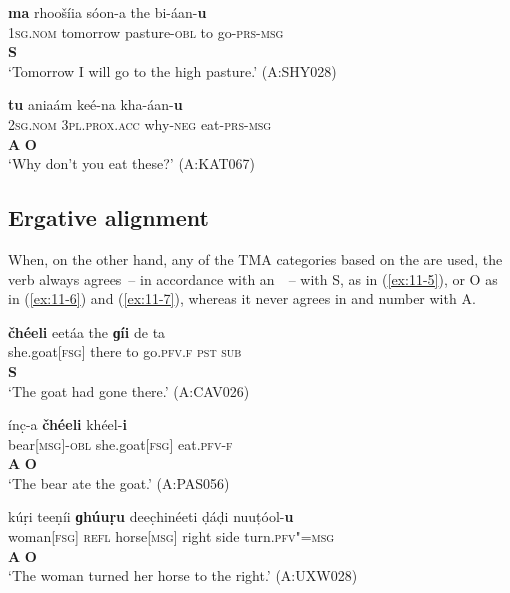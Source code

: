 \begin{exe}
\ex
\label{ex:11-3}
\glll \textbf{ma} rhoošíia sóon-a the bi-áan-\textbf{u}\\
\textsc{1sg.nom} tomorrow pasture-\textsc{obl} to go-\textsc{prs-}\textsc{msg}\\
\textbf{S}\\
\glt `Tomorrow I will go to the high pasture.' (A:SHY028)

\ex
\label{ex:11-4}
\glll \textbf{tu} aniaám keé-na kha-áan-\textbf{u}\\
\textsc{2sg.nom} \textsc{3pl.prox.acc} why-\textsc{neg} eat-\textsc{prs-}\textsc{msg} \\
\textbf{A} \textbf{O}\\
\glt `Why don't you eat these?' (A:KAT067)
\end{exe}

\subsection{Ergative alignment}
\label{subsec:11-1-2}


When, on the other hand, any of the TMA categories based on the  are used, the verb always agrees~-- in accordance with an~~-- with S, as in (\ref{ex:11-5}), or O as in (\ref{ex:11-6}) and (\ref{ex:11-7}), whereas it never agrees in  and number with A.

\begin{exe}
\ex
\label{ex:11-5}
\glll \textbf{čhéeli} eetáa the \textbf{ɡíi} de ta\\
she.goat[\textsc{fsg}] there to go.\textsc{pfv.}\textsc{f} \textsc{pst} \textsc{sub}\\
 \textbf{S} \\
\glt `The goat had gone there.' (A:CAV026)

\ex
\label{ex:11-6}
\glll ínc̣-a \textbf{čhéeli} khéel-\textbf{i}\\
bear[\textsc{msg}]-\textsc{obl} she.goat[\textsc{fsg}] eat.\textsc{pfv-}\textsc{f}\\
\textbf{A} \textbf{O} \\
\glt `The bear ate the goat.' (A:PAS056)

\ex
\label{ex:11-7}
\glll kúṛi teeṇíi \textbf{ɡhúuṛu} deec̣hinéeti ḍáḍi nuuṭóol-\textbf{u}\\
woman[\textsc{fsg}] \textsc{refl} horse[\textsc{msg}] right side turn.\textsc{pfv"=msg}\\
\textbf{A} {} \textbf{O} {} {}   \\
\glt `The woman turned her horse to the right.' (A:UXW028)
\end{exe}


